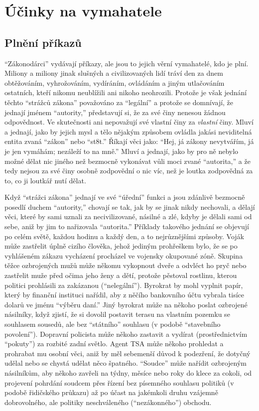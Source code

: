 \documentclass{book}
\begin{document}
\chapter{Účinky na vymahatele}

\section{Plnění příkazů}

\enquote{Zákonodárci} vydávají příkazy, ale jsou to jejich věrní vymahatelé, kdo je plní. Miliony a miliony jinak slušných a civilizovaných lidí tráví den za dnem obtěžováním, vyhrožováním, vydíráním, ovládáním a jiným utlačováním ostatních, kteří nikomu neublížili ani nikoho neohrozili. Protože je však jednání těchto \enquote{strážců zákona} považováno za \enquote{legální} a protože se domnívají, že jednají jménem \enquote{autority,} představují si, že za své činy nenesou žádnou odpovědnost. Ve skutečnosti ani nepovažují své vlastní činy za \emph{vlastní} činy. Mluví a jednají, jako by jejich mysl a tělo nějakým způsobem ovládla jakási neviditelná entita zvaná \enquote{zákon} nebo \enquote{st8t.} Říkají věci jako: \enquote{Hej, já zákony nevytvářím, já je jen vymáhám; nezáleží to na mně.} Mluví a jednají, jako by pro ně nebylo možné dělat nic jiného než bezmocně vykonávat vůli moci zvané \enquote{autorita,} a že tedy nejsou za své činy osobně zodpovědní o nic víc, než je loutka zodpovědná za to, co ji loutkář nutí dělat.

Když \enquote{strážci zákona} jednají ve své \enquote{úřední} funkci a jsou zdánlivě bezmocně posedlí duchem \enquote{autority,} chovají se tak, jak by se jinak nikdy nechovali, a dělají věci, které by sami uznali za necivilizované, násilné a zlé, kdyby je dělali sami od sebe, aniž by jim to nařizovala \enquote{autorita.} Příklady takového jednání se objevují po celém světě, každou hodinu a každý den, a to nejrůznějšími způsoby. Voják může zastřelit úplně cizího člověka, jehož jediným prohřeškem bylo, že se po vyhlášeném zákazu vycházení procházel ve vojensky okupované zóně. Skupina těžce ozbrojených mužů může někomu vykopnout dveře a odvléct ho pryč nebo zastřelit muže před očima jeho ženy a dětí, protože pěstoval rostlinu, kterou politici prohlásili za zakázanou (\enquote{nelegální}). Byrokrat by mohl vyplnit papír, který by finanční instituci nařídil, aby z něčího bankovního účtu vybrala tisíce dolarů ve jménu \enquote{výběru daní.} Jiný byrokrat může na někoho poslat ozbrojené násilníky, když zjistí, že si dovolil postavit terasu na vlastním pozemku se souhlasem sousedů, ale bez \enquote{státního} souhlasu (v podobě \enquote{stavebního povolení}). Dopravní policista může někoho zastavit a vydírat (prostřednictvím \enquote{pokuty}) za rozbité zadní světlo. Agent TSA může někoho prohledat a prohrabat mu osobní věci, aniž by měl sebemenší důvod k podezření, že dotyčný udělal nebo se chystá udělat něco špatného. \enquote{Soudce} může nařídit ozbrojeným násilníkům, aby někoho zavřeli na týdny, měsíce nebo roky do klece za cokoli, od projevení pohrdání soudcem přes řízení bez písemného souhlasu politiků (v podobě řidičského průkazu) až po účast na jakémkoli druhu vzájemně dobrovolného, ale politiky neschváleného (\enquote{nezákonného}) obchodu.
\end{document}
